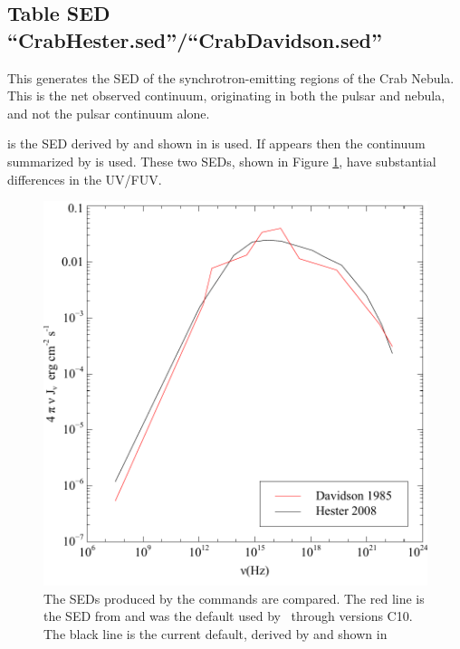 \subsection{Table SED ``CrabHester.sed''/``CrabDavidson.sed''}

\noindent This generates the SED of the synchrotron-emitting
regions of the Crab Nebula.  
This is the net observed continuum, originating in both the pulsar and
nebula, and not the pulsar continuum alone.

 is the SED derived by 
\cite{Atoyan.A96On-the-mechanisms-of-gamma-radiation-in-the-Crab}
and shown in \citet{Hester.J08The-Crab-Nebula:-An-Astrophysical-Chimera}
is used.
If  appears then
the continuum summarized by
\citet{Davidson1985} is used.
These two SEDs,
shown in Figure \ref{fig:CrabSED}, 
have substantial differences in the UV/FUV.

\begin{figure}
\centering
\includegraphics{CrabSED}
\caption[Crab Nebula SED]
{\label{fig:CrabSED}The SEDs produced by the  
commands are compared.
The red line is the SED from \citet{Davidson1985} and 
was the default used
by \Cloudy\ through versions C10.
The black line is the current default, derived by 
\cite{Atoyan.A96On-the-mechanisms-of-gamma-radiation-in-the-Crab}
and shown in \citet{Hester.J08The-Crab-Nebula:-An-Astrophysical-Chimera}}
\end{figure}

